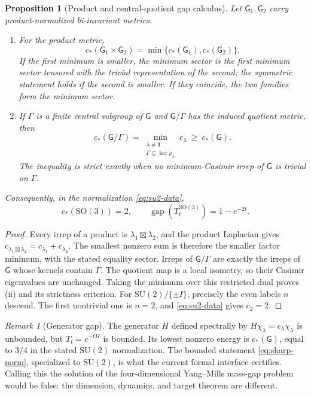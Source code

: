 \documentclass[11pt]{article}
\newtheorem{proposition}[theorem]{Proposition}
\theoremstyle{remark}
\newtheorem{remark}[theorem]{Remark}
\newcommand{\SU}{\mathrm{SU}(2)}
\newcommand{\G}{\mathsf G}
\begin{document}
\begin{proposition}[Product and central-quotient gap calculus]
\label{prop:gap-calculus}
Let $\G_1,\G_2$ carry product-normalized bi-invariant metrics.
\begin{enumerate}[label=(\roman*),itemsep=2pt]
\item For the product metric,
\[
 c_*(\G_1\times\G_2)=\min\{c_*(\G_1),c_*(\G_2)\}.
\]
If the first minimum is smaller, the minimum sector is the first minimum sector
tensored with the trivial representation of the second; the symmetric statement
holds if the second is smaller.  If they coincide, the two families form the
minimum sector.
\item If $\Gamma$ is a finite central subgroup of $\G$ and $\G/\Gamma$ has the
induced quotient metric, then
\[
 c_*(\G/\Gamma)
 =\min_{\substack{\lambda\ne\mathbf1\\ \Gamma\subseteq\ker\rho_\lambda}}
 c_\lambda\ \ge\ c_*(\G).
\]
The inequality is strict exactly when no minimum-Casimir irrep of $\G$ is
trivial on $\Gamma$.
\end{enumerate}
Consequently, in the normalization \eqref{eq:su2-data},
\begin{equation}\label{eq:so3-gap}
 c_*(\mathrm{SO}(3))=2,\qquad
 \operatorname{gap}(T_t^{\mathrm{SO}(3)})=1-e^{-2t}.
\end{equation}
\end{proposition}

\begin{proof}
Every irrep of a product is $\lambda_1\boxtimes\lambda_2$, and the product
Laplacian gives $c_{\lambda_1\boxtimes\lambda_2}=c_{\lambda_1}+c_{\lambda_2}$.
The smallest nonzero sum is therefore the smaller factor minimum, with the
stated equality sector.  Irreps of $\G/\Gamma$ are exactly the irreps of $\G$
whose kernels contain $\Gamma$.  The quotient map is a local isometry, so their
Casimir eigenvalues are unchanged.  Taking the minimum over this restricted
dual proves (ii) and its strictness criterion.  For
$\SU/\{\pm I\}$, precisely the even labels $n$ descend.  The first nontrivial
one is $n=2$, and \eqref{eq:su2-data} gives $c_2=2$.
\end{proof}

\begin{remark}[Generator gap]
The generator $H$ defined spectrally by
$H\chi_\lambda=c_\lambda\chi_\lambda$ is unbounded, but
$T_t=e^{-tH}$ is bounded.  Its lowest nonzero energy is $c_*(\G)$, equal to
$3/4$ in the stated $\SU$ normalization.  The bounded
statement \eqref{eq:sharp-norm}, specialized to $\SU$, is what the current
formal interface certifies.  Calling
this the solution of the four-dimensional Yang--Mills mass-gap problem would
be false: the dimension, dynamics, and target theorem are different.
\end{remark}
\end{document}
